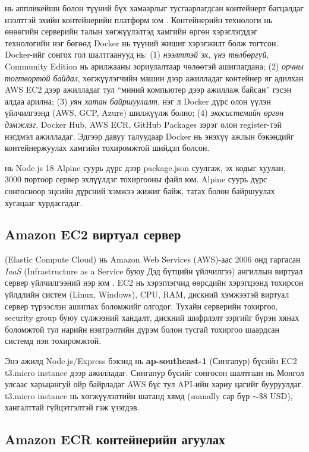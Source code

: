  нь аппликейшн болон түүний бүх хамаарлыг тусгаарлагдсан контейнерт багцалдаг нээлттэй эхийн контейнерийн платформ юм \cite{docker_doc}. Контейнерийн технологи нь өнөөгийн серверийн талын хөгжүүлэлтэд хамгийн өргөн хэрэглэгддэг технологийн нэг бөгөөд Docker нь түүний жишиг хэрэгжилт болж тогтсон. Docker-ийг сонгох гол шалтгаанууд нь: (1) \textit{нээлттэй эх, үнэ төлбөргүй}, Community Edition нь арилжааны зориулалтаар чөлөөтэй ашиглагдана; (2) \textit{орчны тогтвортой байдал}, хөгжүүлэгчийн машин дээр ажилладаг контейнер яг адилхан AWS EC2 дээр ажилладаг тул ``миний компьютер дээр ажиллаж байсан'' гэсэн алдаа арилна; (3) \textit{уян хатан байршуулалт}, нэг л Docker дүрс олон үүлэн үйлчилгээнд (AWS, GCP, Azure) шилжүүлж болно; (4) \textit{экосистемийн өргөн дэмжлэг}, Docker Hub, AWS ECR, GitHub Packages зэрэг олон register-тэй нэгдмэл ажилладаг. Эдгээр давуу талуудаар Docker нь энэхүү ажлын бэкэндийг контейнержуулах хамгийн тохиромжтой шийдэл болсон.

 нь Node.js 18 Alpine суурь дүрс дээр package.json суулгаж, эх кодыг хуулан, 3000 портоор сервер эхлүүлдэг тохиргооны файл юм. Alpine суурь дүрс сонгосноор эцсийн дүрсний хэмжээ жижиг байж, татах болон байршуулах хугацааг хурдасгадаг.

\subsection*{Amazon EC2 виртуал сервер}

 (Elastic Compute Cloud) нь Amazon Web Services (AWS)-аас 2006 онд гаргасан \textit{IaaS} (Infrastructure as a Service буюу Дэд бүтцийн үйлчилгээ) ангиллын виртуал сервер үйлчилгээний нэр юм \cite{aws_ec2_doc}. EC2 нь хэрэглэгчид өөрсдийн хэрэгцээнд тохирсон үйлдлийн систем (Linux, Windows), CPU, RAM, дискний хэмжээтэй виртуал сервер түрээслэн ашиглах боломжийг олгодог. Тухайн серверийн тохиргоо, security group буюу сүлжээний хандалт, дискний шифрлэлт зэргийг бүрэн хянах боломжтой тул нарийн нэвтрэлтийн дүрэм болон тусгай тохиргоо шаардсан системд нэн тохиромжтой.

Энэ ажилд Node.js/Express бэкэнд нь \textbf{ap-southeast-1} (Сингапур) бүсийн EC2 t3.micro instance дээр ажилладаг. Сингапур бүсийг сонгосон шалтгаан нь Монгол улсаас харьцангуй ойр байрладаг AWS бүс тул API-ийн хариу цагийг бууруулдаг. t3.micro instance нь хөгжүүлэлтийн шатанд хямд (saanally сар бүр $\sim$\$8 USD), хангалттай гүйцэтгэлтэй гэж үзэгдэв.

\subsection*{Amazon ECR контейнерийн агуулах}

